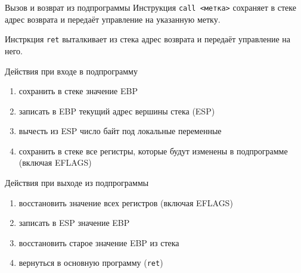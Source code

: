 \documentclass[utf8, russian]{beamer}
\begin{document}
    \begin{frame}{Вызов и возврат из подпрограммы}\small
        Инструкция {\tt call <метка>} сохраняет в стеке адрес возврата и передаёт управление на указанную метку.

        Инстркция {\tt ret} выталкивает из стека адрес возврата и передаёт управление на него.

        \begin{block}{Действия при входе в подпрограмму}\small
            \begin{enumerate}
                \item сохранить в стеке значение EBP
                \item записать в EBP текущий адрес вершины стека (ESP)
                \item вычесть из ESP число байт под локальные переменные
                \item сохранить в стеке все регистры, которые будут изменены в подпрограмме (включая EFLAGS)
            \end{enumerate}
        \end{block}

        \begin{block}{Действия при выходе из подпрограммы}\small
            \begin{enumerate}
                \item восстановить значение всех регистров (включая EFLAGS)
                \item записать в ESP значение EBP
                \item восстановить старое значение EBP из стека
                \item вернуться в основную программу ({\tt  ret})
            \end{enumerate}
        \end{block}
    \end{frame}
\end{document}
